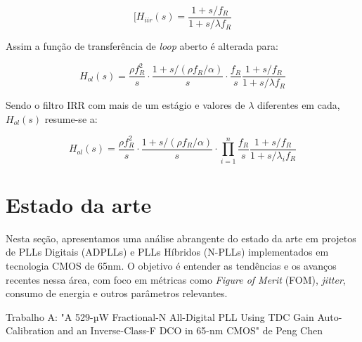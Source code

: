 	\begin{equation}
	[H_{iir}(s) = \frac{ 1 + s/f_R}{ 1 + s/\lambda f_R}
	\label{eq:irr_s_domain}
	\end{equation}
	
Assim a função de transferência de \textit{loop} aberto é alterada para:


\begin{equation}
	H_{ol}(s) = \frac{\rho f_R^2}{s} \cdot \frac{1 + s/(\rho f_R / \alpha)}{s} \cdot \frac{f_R}{s} \frac{ 1 + s/f_R}{ 1 + s/\lambda f_R}
	\label{eq:hol_irr_simgle}
\end{equation}


Sendo o filtro IRR com mais de um estágio e valores de $\lambda$ diferentes em cada,  $H_{ol}(s)$ resume-se a:

\begin{equation}
H_{ol}(s) = \frac{\rho f_R^2}{s} \cdot \frac{1 + s/(\rho f_R / \alpha)}{s} \cdot \prod_{i=1}^{n} \frac{f_R}{s} \frac{ 1 + s/f_R}{ 1 + s/\lambda_i f_R}
	\label{eq:hol_irr_cascade}
\end{equation}


\section{Estado da arte}

Nesta seção, apresentamos uma análise abrangente do estado da arte em projetos de PLLs Digitais (ADPLLs) e PLLs Híbridos (N-PLLs) implementados em tecnologia CMOS de 65nm. O objetivo é entender as tendências e os avanços recentes nessa área, com foco em métricas como \textit{Figure of Merit} (FOM), \textit{jitter}, consumo de energia e outros parâmetros relevantes.


Trabalho A: "A 529-µW Fractional-N All-Digital PLL Using TDC Gain Auto-Calibration and an Inverse-Class-F DCO in 65-nm CMOS" de Peng Chen

